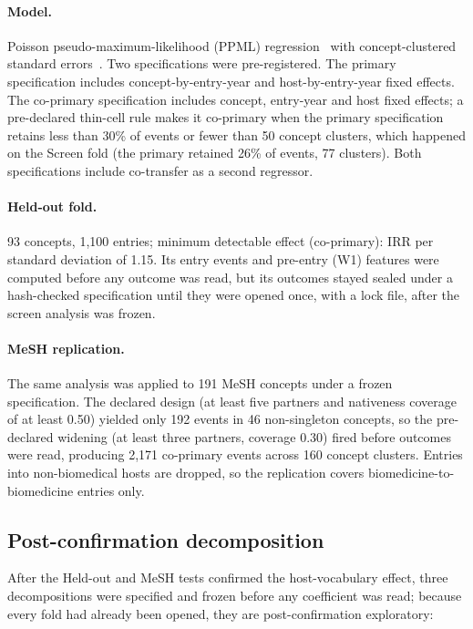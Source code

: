 \documentclass[11pt,letterpaper]{article}
\begin{document}
\paragraph{Model.} Poisson pseudo-maximum-likelihood (PPML) regression~\citep{Silva2006} with
concept-clustered standard errors~\citep{Cameron2015}. Two specifications were pre-registered. The primary
specification includes concept-by-entry-year and host-by-entry-year fixed effects. The co-primary specification
includes concept, entry-year and host fixed effects; a pre-declared thin-cell rule makes it co-primary when the
primary specification retains less than 30\% of events or fewer than 50 concept clusters, which happened on the
Screen fold (the primary retained 26\% of events, 77 clusters). Both specifications include co-transfer as a second
regressor.

\paragraph{Held-out fold.} 93 concepts, 1,100 entries; minimum detectable effect (co-primary): IRR per
standard deviation of 1.15. Its entry events and pre-entry (W1) features were computed before any outcome was
read, but its outcomes stayed sealed under a hash-checked specification until they were opened once, with a
lock file, after the screen analysis was frozen.

\paragraph{MeSH replication.} The same analysis was applied to 191 MeSH concepts under a frozen specification.
The declared design (at least five partners and nativeness coverage of at least 0.50) yielded only 192 events in
46 non-singleton concepts, so the pre-declared widening (at least three partners, coverage 0.30) fired before
outcomes were read, producing 2,171 co-primary events across 160 concept clusters. Entries into non-biomedical
hosts are dropped, so the replication covers biomedicine-to-biomedicine entries only.

\subsection{Post-confirmation decomposition}
\label{sec:decomposition}

After the Held-out and MeSH tests confirmed the host-vocabulary effect, three decompositions were
specified and frozen before any coefficient was read; because every fold had already been opened, they are
post-confirmation exploratory:
\end{document}
